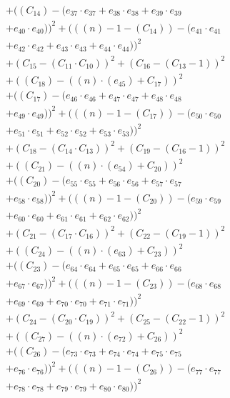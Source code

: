 \documentclass[10pt, a4paper]{article}
\begin{document}
\begin{align*}
& + ((C_{14}) - (e_{37} \cdot e_{37} + e_{38} \cdot e_{38} + e_{39} \cdot e_{39} \\
& + e_{40} \cdot e_{40}))^{2} + (((n) - 1 - (C_{14})) - (e_{41} \cdot e_{41} \\
& + e_{42} \cdot e_{42} + e_{43} \cdot e_{43} + e_{44} \cdot e_{44}))^{2} \\
& + (C_{15} - (C_{11}  \cdot  C_{10}))^{2} + (C_{16} - (C_{13} - 1))^{2} \\
& + ((C_{18}) - ((n)  \cdot  (e_{45}) + C_{17}))^{2} \\
& + ((C_{17}) - (e_{46} \cdot e_{46} + e_{47} \cdot e_{47} + e_{48} \cdot e_{48} \\
& + e_{49} \cdot e_{49}))^{2} + (((n) - 1 - (C_{17})) - (e_{50} \cdot e_{50} \\
& + e_{51} \cdot e_{51} + e_{52} \cdot e_{52} + e_{53} \cdot e_{53}))^{2} \\
& + (C_{18} - (C_{14}  \cdot  C_{13}))^{2} + (C_{19} - (C_{16} - 1))^{2} \\
& + ((C_{21}) - ((n)  \cdot  (e_{54}) + C_{20}))^{2} \\
& + ((C_{20}) - (e_{55} \cdot e_{55} + e_{56} \cdot e_{56} + e_{57} \cdot e_{57} \\
& + e_{58} \cdot e_{58}))^{2} + (((n) - 1 - (C_{20})) - (e_{59} \cdot e_{59} \\
& + e_{60} \cdot e_{60} + e_{61} \cdot e_{61} + e_{62} \cdot e_{62}))^{2} \\
& + (C_{21} - (C_{17}  \cdot  C_{16}))^{2} + (C_{22} - (C_{19} - 1))^{2} \\
& + ((C_{24}) - ((n)  \cdot  (e_{63}) + C_{23}))^{2} \\
& + ((C_{23}) - (e_{64} \cdot e_{64} + e_{65} \cdot e_{65} + e_{66} \cdot e_{66} \\
& + e_{67} \cdot e_{67}))^{2} + (((n) - 1 - (C_{23})) - (e_{68} \cdot e_{68} \\
& + e_{69} \cdot e_{69} + e_{70} \cdot e_{70} + e_{71} \cdot e_{71}))^{2} \\
& + (C_{24} - (C_{20}  \cdot  C_{19}))^{2} + (C_{25} - (C_{22} - 1))^{2} \\
& + ((C_{27}) - ((n)  \cdot  (e_{72}) + C_{26}))^{2} \\
& + ((C_{26}) - (e_{73} \cdot e_{73} + e_{74} \cdot e_{74} + e_{75} \cdot e_{75} \\
& + e_{76} \cdot e_{76}))^{2} + (((n) - 1 - (C_{26})) - (e_{77} \cdot e_{77} \\
& + e_{78} \cdot e_{78} + e_{79} \cdot e_{79} + e_{80} \cdot e_{80}))^{2} \\

\end{align*}
\end{document}
